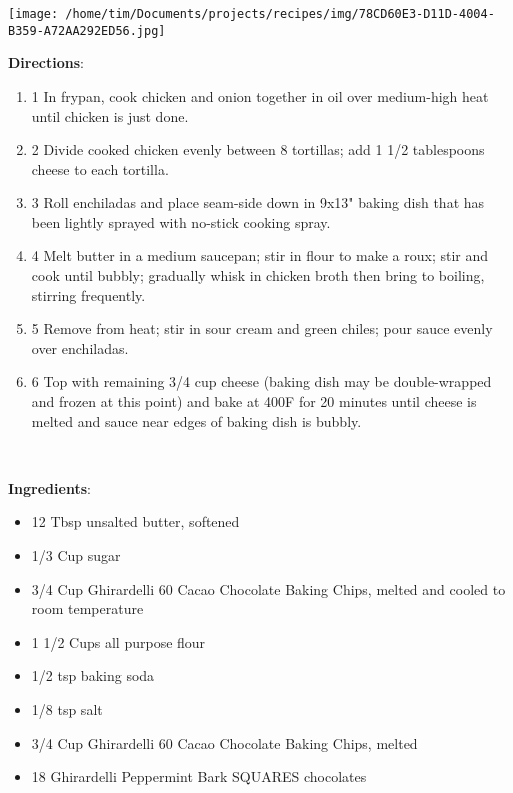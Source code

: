 \documentclass[11pt, twoside, openany]{book}
\begin{document}
\begin{minipage}[t]{0.2\linewidth}
\centering \strut\vspace*{-\baselineskip}\newline
\texttt{[image: /home/tim/Documents/projects/recipes/img/78CD60E3-D11D-4004-B359-A72AA292ED56.jpg]}\\
\end{minipage}\vspace{3mm}
\textbf{Directions}:
\vspace{-3mm}\begin{enumerate}\setlength\itemsep{-1mm}
\item 1 In frypan, cook chicken and onion together in oil over medium-high heat until chicken is just done.
\item 2 Divide cooked chicken evenly between 8 tortillas; add 1 1/2 tablespoons cheese to each tortilla.
\item 3 Roll enchiladas and place seam-side down in 9x13" baking dish that has been lightly sprayed with no-stick cooking spray.
\item 4 Melt butter in a medium saucepan; stir in flour to make a roux; stir and cook until bubbly; gradually whisk in chicken broth then bring to boiling, stirring frequently.
\item 5 Remove from heat; stir in sour cream and green chiles; pour sauce evenly over enchiladas.
\item 6 Top with remaining 3/4 cup cheese (baking dish may be double-wrapped and frozen at this point) and bake at 400F for 20 minutes until cheese is melted and sauce near edges of baking dish is bubbly.
\end{enumerate}
 \label{chocolate-peppermint-bark-sandwich-cookies}\hfill\textit{}\\
\begin{minipage}[t]{0.8\linewidth}
\textbf{Ingredients}:\vspace{-3mm}
\begin{multicols}{2}
\begin{itemize}\setlength\itemsep{-1mm}
\item 12 Tbsp unsalted butter, softened
\item 1/3 Cup sugar
\item 3/4 Cup Ghirardelli 60 Cacao Chocolate Baking Chips, melted and cooled to room temperature
\item 1 1/2 Cups all purpose flour
\item 1/2 tsp baking soda
\item 1/8 tsp salt
\item 3/4 Cup Ghirardelli 60 Cacao Chocolate Baking Chips, melted
\item 18 Ghirardelli Peppermint Bark SQUARES chocolates
\end{itemize}
\end{multicols}
\end{minipage}
\end{document}
